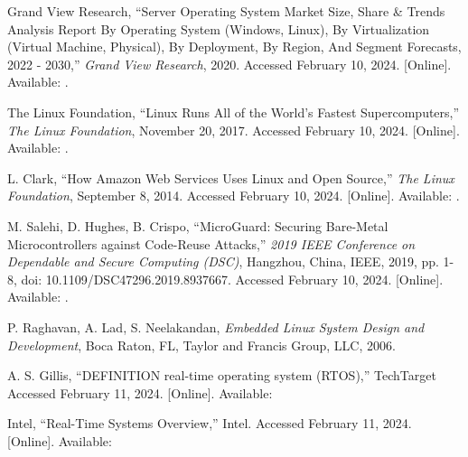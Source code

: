 \begin{thebibliography}{99}
        Grand View Research,
        ``Server Operating System Market Size, Share \& Trends Analysis Report By Operating System (Windows, Linux), By Virtualization (Virtual Machine, Physical), By Deployment, By Region, And Segment Forecasts, 2022 - 2030,''
        \textit{Grand View Research}, 2020.
        Accessed February 10, 2024.
        [Online].
        Available: .

        The Linux Foundation,
        ``Linux Runs All of the World's Fastest Supercomputers,''
        \textit{The Linux Foundation}, November 20, 2017.
        Accessed February 10, 2024.
        [Online].
        Available: .

        L. Clark,
        ``How Amazon Web Services Uses Linux and Open Source,''
        \textit{The Linux Foundation}, September 8, 2014.
        Accessed February 10, 2024.
        [Online].
        Available: .

        M. Salehi, D. Hughes, B. Crispo,
        ``MicroGuard: Securing Bare-Metal Microcontrollers against Code-Reuse Attacks,''
        \textit{2019 IEEE Conference on Dependable and Secure Computing (DSC)},
        Hangzhou, China, IEEE, 2019, pp. 1-8, doi: 10.1109/DSC47296.2019.8937667.
        Accessed February 10, 2024.
        [Online].
        Available: .

        P. Raghavan, A. Lad, S. Neelakandan,
        \textit{Embedded Linux System Design and Development},
        Boca Raton, FL, Taylor and Francis Group, LLC, 2006.

        A. S. Gillis,
        ``DEFINITION real-time operating system (RTOS),''
        TechTarget
        Accessed February 11, 2024.
        [Online].
        Available: 

        Intel,
        ``Real-Time Systems Overview,''
        Intel.
        Accessed February 11, 2024.
        [Online].
        Available: 


\end{thebibliography}
